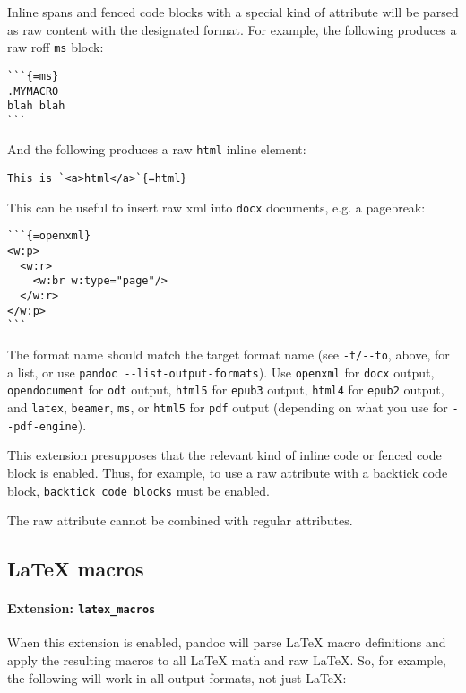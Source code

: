 Inline spans and fenced code blocks with a special kind of attribute
will be parsed as raw content with the designated format. For example,
the following produces a raw roff \texttt{ms} block:

\begin{verbatim}
```{=ms}
.MYMACRO
blah blah
```
\end{verbatim}

And the following produces a raw \texttt{html} inline element:

\begin{verbatim}
This is `<a>html</a>`{=html}
\end{verbatim}

This can be useful to insert raw xml into \texttt{docx} documents, e.g.
a pagebreak:

\begin{verbatim}
```{=openxml}
<w:p>
  <w:r>
    <w:br w:type="page"/>
  </w:r>
</w:p>
```
\end{verbatim}

The format name should match the target format name (see
\texttt{-t/-\/-to}, above, for a list, or use
\texttt{pandoc\ -\/-list-output-formats}). Use \texttt{openxml} for
\texttt{docx} output, \texttt{opendocument} for \texttt{odt} output,
\texttt{html5} for \texttt{epub3} output, \texttt{html4} for
\texttt{epub2} output, and \texttt{latex}, \texttt{beamer}, \texttt{ms},
or \texttt{html5} for \texttt{pdf} output (depending on what you use for
\texttt{-\/-pdf-engine}).

This extension presupposes that the relevant kind of inline code or
fenced code block is enabled. Thus, for example, to use a raw attribute
with a backtick code block, \texttt{backtick\_code\_blocks} must be
enabled.

The raw attribute cannot be combined with regular attributes.

\hypertarget{latex-macros}{%
\subsection{LaTeX macros}\label{latex-macros}}

\hypertarget{extension-latex_macros}{%
\paragraph{\texorpdfstring{Extension:
\texttt{latex\_macros}}{Extension: latex\_macros}}\label{extension-latex_macros}}

When this extension is enabled, pandoc will parse LaTeX macro
definitions and apply the resulting macros to all LaTeX math and raw
LaTeX. So, for example, the following will work in all output formats,
not just LaTeX:

